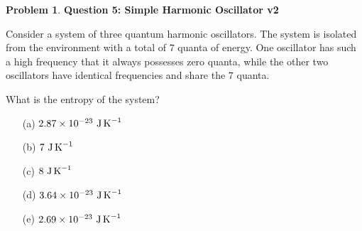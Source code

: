 \documentclass[10pt]{article}
\theoremstyle{definition} %
\newtheorem{problem}{Problem}
\theoremstyle{plain} %
\begin{document}
                                                  \begin{problem}
                                                    \textbf{Question 5: Simple Harmonic Oscillator v2}
                                                    
                                                    Consider a system of three quantum harmonic oscillators.  
                                                    The system is isolated from the environment with a total of \(7\) quanta of energy.  
                                                    One oscillator has such a high frequency that it always possesses zero quanta,  
                                                    while the other two oscillators have identical frequencies and share the \(7\) quanta.
                                                    
                                                    \medskip
                                                    What is the entropy of the system?
                                                    
                                                    \begin{enumerate}
                                                      \item[(a)] \(2.87\times10^{-23}\ \text{J\,K}^{-1}\)
                                                      \item[(b)] \(7\ \text{J\,K}^{-1}\)
                                                      \item[(c)] \(8\ \text{J\,K}^{-1}\)
                                                      \item[(d)] \(3.64\times10^{-23}\ \text{J\,K}^{-1}\)
                                                      \item[(e)] \(2.69\times10^{-23}\ \text{J\,K}^{-1}\)
                                                    \end{enumerate}
                                                    \end{problem}
\end{document}
